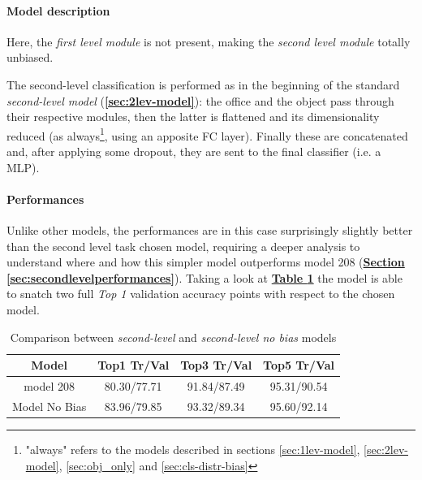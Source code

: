 \documentclass[12pt]{article}
\begin{document}
\paragraph{Model description}
Here, the \textit{first level module} is not present, making the \textit{second level module} totally unbiased.

The second-level classification is performed as in the beginning of the standard \textit{second-level model} (\textbf{\ref{sec:2lev-model}}): the office and the object pass through their respective modules, then the latter is flattened and its dimensionality reduced (as always\footnote{\label{ftnote:always} "always" refers to the models described in sections \ref{sec:1lev-model}, \ref{sec:2lev-model}, \ref{sec:obj_only} and \ref{sec:cls-distr-bias}}, using an apposite FC layer).
Finally these are concatenated and, after applying some dropout, they are sent to the final classifier (i.e. a MLP).
\paragraph{Performances}\label{sec:secondnobiasperformances}
Unlike other models, the performances are in this case surprisingly slightly better than the second level task chosen model, requiring a deeper analysis to understand where and how this simpler model outperforms model 208 (\hyperref[sec:secondlevelperformances]{\textbf{Section \ref{sec:secondlevelperformances}}}). Taking a look at \hyperref[tb:secondnobias]{\textbf{Table \ref{tb:secondnobias}}} the model is able to snatch two full \textit{Top 1} validation accuracy points with respect to the chosen model. 

\begin{table}[ht!]
    \begin{adjustwidth}{}{}
	    \centering
	    \small
	    \begin{tabular}{ |c|c|c|c| }
        \hline
        \textbf{Model} & \textbf{Top1 Tr/Val} & \textbf{Top3 Tr/Val} & \textbf{Top5 Tr/Val}\\
        \hline
        model 208 & 80.30/77.71 & 91.84/87.49 & 95.31/90.54 \\
        Model No Bias &  83.96/79.85 & 93.32/89.34 & 95.60/92.14\\
        \hline
        \end{tabular}
    \end{adjustwidth}
    \captionsetup{justification   = centering}
    \caption{Comparison between \textit{second-level} and \textit{second-level no bias} models}
    \label{tb:secondnobias}
\end{table}
\end{document}
